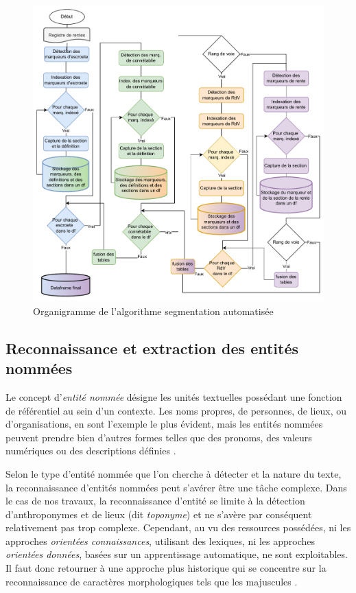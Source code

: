 \begin{figure}[ht] %
    \centering
    \includegraphics[scale=0.75]{2.Methods/Img/seg.drawio.pdf} 
    \caption{Organigramme de l'algorithme segmentation automatisée}
    \label{schemaSeg}
\end{figure}

\subsection{Reconnaissance et extraction des entités nommées}
Le concept d'\textit{entité nommée} désigne les unités textuelles possédant une fonction de référentiel au sein d'un contexte. Les noms propres, de personnes, de lieux, ou d'organisations, en sont l'exemple le plus évident, mais les entités nommées peuvent prendre bien d'autres formes telles que des pronoms, des valeurs numériques ou des descriptions définies \parencite{omrane_les_2010,nadeau_survey_2007}.

Selon le type d'entité nommée que l'on cherche à détecter et la nature du texte, la reconnaissance d'entités nommées peut s'avérer être une tâche complexe. Dans le cas de nos travaux, la reconnaissance d'entité se limite à la détection d'anthroponymes et de lieux (dit \textit{toponyme}) et ne s'avère par conséquent relativement pas trop complexe. Cependant, au vu des ressources possédées, ni les approches \textit{orientées connaissances}, utilisant des lexiques, ni les approches \textit{orientées données}, basées sur un apprentissage automatique,  ne sont exploitables. Il faut donc retourner à une  approche plus historique qui se concentre sur la reconnaissance de caractères morphologiques tels que les majuscules \parencite{nouvel_reconnaissance_2012}. 

